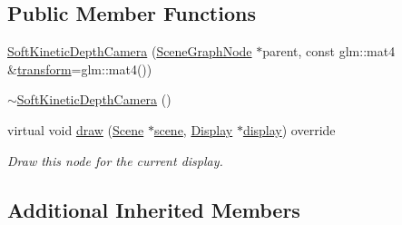 \subsection*{Public Member Functions}
\begin{DoxyCompactItemize}
\item 
\hyperlink{classmotorcar_1_1SoftKineticDepthCamera_a756169c04b00c2bb8edbef021843caea}{Soft\-Kinetic\-Depth\-Camera} (\hyperlink{classmotorcar_1_1SceneGraphNode}{Scene\-Graph\-Node} $\ast$parent, const glm\-::mat4 \&\hyperlink{classmotorcar_1_1SceneGraphNode_ad96e79fdd739ac8223a3128003be391a}{transform}=glm\-::mat4())
\item 
\hyperlink{classmotorcar_1_1SoftKineticDepthCamera_a09e7effa3479c81ebc602397249eda48}{$\sim$\-Soft\-Kinetic\-Depth\-Camera} ()
\item 
virtual void \hyperlink{classmotorcar_1_1SoftKineticDepthCamera_a2752b6bf323e019a4cec43b61d78bcff}{draw} (\hyperlink{classmotorcar_1_1Scene}{Scene} $\ast$\hyperlink{classmotorcar_1_1SceneGraphNode_aa14e637ed4ae98f77e28941a4b5cfdd8}{scene}, \hyperlink{classmotorcar_1_1Display}{Display} $\ast$\hyperlink{structdisplay}{display}) override
\begin{DoxyCompactList}\small\item\em Draw this node for the current display. \end{DoxyCompactList}\end{DoxyCompactItemize}
\subsection*{Additional Inherited Members}


